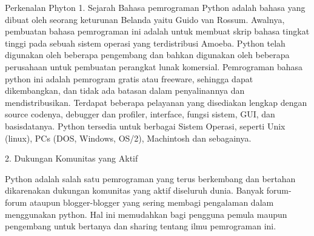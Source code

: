 Perkenalan Phyton
1. Sejarah
Bahasa pemrograman Python adalah bahasa yang dibuat oleh seorang keturunan Belanda yaitu Guido van Rossum. Awalnya, pembuatan bahasa pemrograman ini adalah untuk membuat skrip bahasa tingkat tinggi pada sebuah sistem operasi yang terdistribusi Amoeba. Python telah digunakan oleh beberapa pengembang dan bahkan digunakan oleh beberapa perusahaan untuk pembuatan perangkat lunak komersial.
Pemrograman bahasa python ini adalah pemrogram gratis atau freeware, sehingga dapat dikembangkan, dan tidak ada batasan dalam penyalinannya dan mendistribusikan. Terdapat beberapa pelayanan yang disediakan lengkap dengan source codenya, debugger dan profiler, interface, fungsi sistem, GUI, dan basisdatanya. Python tersedia untuk berbagai Sistem Operasi, seperti Unix (linux), PCs (DOS, Windows, OS/2), Machintosh dan sebagainya.

2. Dukungan Komunitas yang Aktif

Python adalah salah satu pemrograman yang terus berkembang dan bertahan dikarenakan dukungan komunitas yang aktif diseluruh dunia. Banyak forum-forum ataupun blogger-blogger yang sering membagi pengalaman dalam menggunakan python. Hal ini memudahkan bagi pengguna pemula maupun pengembang untuk bertanya dan sharing tentang ilmu pemrograman ini.
